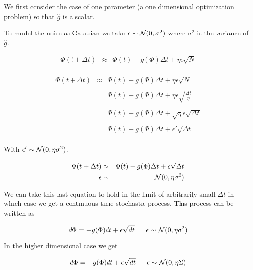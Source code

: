 {

We first consider the case of one parameter (a one dimensional optimization problem) so that $\hat{g}$ is a scalar.

\vfill
To model the noise as Gaussian we take $\epsilon \sim {\cal N}(0,\sigma^2)$ where $\sigma^2$ is the variance of $\hat{g}$.

\begin{eqnarray*}
\Phi(t + \Delta t) & \approx & \Phi(t) -g(\Phi)\Delta t + \eta \epsilon \sqrt{N} \\
\end{eqnarray*}


\begin{eqnarray*}
\Phi(t + \Delta t) & \approx & \Phi(t) -g(\Phi)\Delta t +  \eta \epsilon \sqrt{N} \\
\\
& = & \Phi(t) -g(\Phi)\Delta t +  \eta \epsilon \sqrt{\frac{\Delta t}{\eta}} \\
\\
& = & \Phi(t) -g(\Phi)\Delta t +  \sqrt{\eta} \epsilon \sqrt{\Delta t} \\
\\
& = & \Phi(t) -g(\Phi)\Delta t +  \epsilon' \sqrt{\Delta t} \\
\end{eqnarray*}

\vfill
With $\epsilon' \sim {\cal N}(0,\eta \sigma^2)$.




\begin{eqnarray*}
\Phi(t + \Delta t) & \approx & \Phi(t) -g(\Phi)\Delta t +  \epsilon \sqrt{\Delta t} \\
\epsilon & \sim & {\cal N}(0,\eta\sigma^2)
\end{eqnarray*}

\vfill
We can take this last equation to hold in the limit of arbitrarily small $\Delta t$ in which case we get a continuous time stochastic process.  This process can be written as

{\color{red} $$d\Phi =  -g(\Phi)dt + \epsilon \sqrt{dt}\;\;\;\;\;\; \epsilon \sim {\cal N}(0,\eta\sigma^2)$$}


In the higher dimensional case we get

{\color{red} $$d\Phi =  -g(\Phi)dt + \epsilon \sqrt{dt}\;\;\;\;\;\; \epsilon \sim {\cal N}(0,\eta\Sigma)$$}

}
